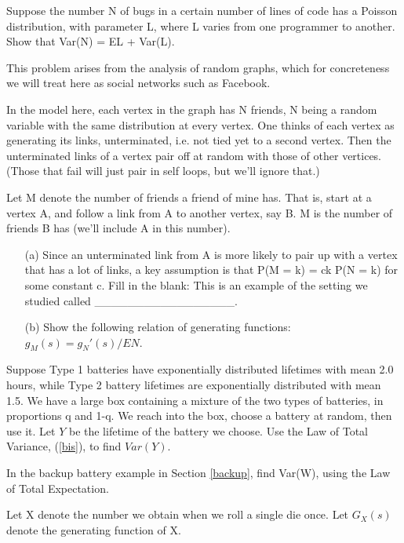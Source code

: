 \oneproblem
Suppose the number N of bugs in a certain number of lines of code has a
Poisson distribution, with parameter L, where L varies from one
programmer to another. Show that Var(N) = EL + Var(L).

\oneproblem
This problem arises from the analysis of random graphs, which for
concreteness we will treat here as social networks such as Facebook.

In the model here, each vertex in the graph has N friends, N being a
random variable with the same distribution at every vertex. One thinks
of each vertex as generating its links, unterminated, i.e. not tied yet
to a second vertex. Then the unterminated links of a vertex pair off at
random with those of other vertices. (Those that fail will just pair in
self loops, but we'll ignore that.)

Let M denote the number of friends a friend of mine has. That is, start
at a vertex A, and follow a link from A to another vertex, say B. M is
the number of friends B has (we'll include A in this number).

\begin{itemize}

\item [(a)] Since an unterminated link from A is more likely to pair up
with a vertex that has a lot of links, a key assumption is that P(M = k)
= ck P(N = k) for some constant c. Fill in the blank: This is an example
of the setting we studied called \_\_\_\_\_\_\_\_\_\_\_\_\_\_\_\_\_.

\item [(b)] Show the following relation of generating functions: $g_M(s)
= g_N'(s)/EN$. 

\end{itemize}

\oneproblem
Suppose Type 1 batteries have exponentially distributed lifetimes with
mean 2.0 hours, while Type 2 battery lifetimes are exponentially
distributed with mean 1.5.  We have a large box containing a mixture of
the two types of batteries, in proportions q and 1-q.  We reach into the
box, choose a battery at random, then use it.  Let $Y$ be the lifetime
of the battery we choose.  Use the Law of Total Variance, (\ref{bis}),
to find $Var(Y)$.


\oneproblem
In the backup battery example in Section \ref{backup}, find Var(W),
using the Law of Total Expectation.

\oneproblem
Let X denote the number we obtain when we roll a single die
once.  Let $G_X(s)$ denote the generating function of X.

